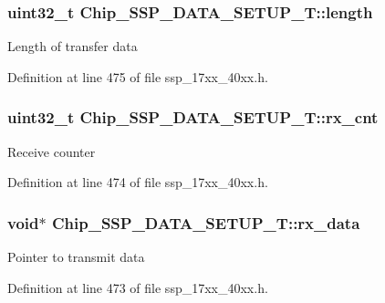 \subsubsection[{\texorpdfstring{length}{length}}]{\setlength{\rightskip}{0pt plus 5cm}uint32\+\_\+t Chip\+\_\+\+S\+S\+P\+\_\+\+D\+A\+T\+A\+\_\+\+S\+E\+T\+U\+P\+\_\+\+T\+::length}\hypertarget{structChip__SSP__DATA__SETUP__T_ac5202ff04a3ed639dce258e31a9000d6}{}\label{structChip__SSP__DATA__SETUP__T_ac5202ff04a3ed639dce258e31a9000d6}
Length of transfer data 

Definition at line 475 of file ssp\+\_\+17xx\+\_\+40xx.\+h.

\subsubsection[{\texorpdfstring{rx\+\_\+cnt}{rx_cnt}}]{\setlength{\rightskip}{0pt plus 5cm}uint32\+\_\+t Chip\+\_\+\+S\+S\+P\+\_\+\+D\+A\+T\+A\+\_\+\+S\+E\+T\+U\+P\+\_\+\+T\+::rx\+\_\+cnt}\hypertarget{structChip__SSP__DATA__SETUP__T_a74d6f8529c17e5e1ce7e78cdeb1a39b4}{}\label{structChip__SSP__DATA__SETUP__T_a74d6f8529c17e5e1ce7e78cdeb1a39b4}
Receive counter 

Definition at line 474 of file ssp\+\_\+17xx\+\_\+40xx.\+h.

\subsubsection[{\texorpdfstring{rx\+\_\+data}{rx_data}}]{\setlength{\rightskip}{0pt plus 5cm}void$\ast$ Chip\+\_\+\+S\+S\+P\+\_\+\+D\+A\+T\+A\+\_\+\+S\+E\+T\+U\+P\+\_\+\+T\+::rx\+\_\+data}\hypertarget{structChip__SSP__DATA__SETUP__T_a06371dd1c78e3cb326a2ccc2811f0346}{}\label{structChip__SSP__DATA__SETUP__T_a06371dd1c78e3cb326a2ccc2811f0346}
Pointer to transmit data 

Definition at line 473 of file ssp\+\_\+17xx\+\_\+40xx.\+h.


